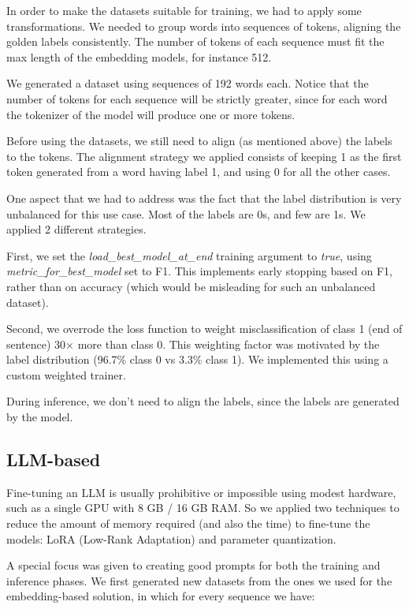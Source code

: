 \documentclass[11pt]{article}
\begin{document}
In order to make the datasets suitable for training, we had to apply some transformations. 
We needed to group words into sequences of tokens, aligning the golden labels consistently.
The number of tokens of each sequence must fit the max length of the embedding models,
for instance 512.

We generated a dataset using sequences of 192 words each. Notice that the number of tokens for each sequence will be strictly greater,
since for each word the tokenizer of the model will produce one or more tokens.

Before using the datasets, we still need to align (as mentioned above) the labels to the tokens.
The alignment strategy we applied consists of keeping 1 as the first token generated from a word
having label 1, and using 0 for all the other cases.

One aspect that we had to address was the fact that the label distribution is very unbalanced
for this use case. Most of the labels are 0s, and few are 1s. We applied 2 different strategies.

First, we set the \emph{load\_best\_model\_at\_end} training argument to \emph{true},
using \emph{metric\_for\_best\_model} set to F1. This implements early stopping based on F1,
rather than on accuracy (which would be misleading for such an unbalanced dataset).

Second, we overrode the loss function to weight misclassification of class 1 (end of sentence) 30× more than class 0. 
This weighting factor was motivated by the label distribution (96.7\% class 0 vs 3.3\% class 1). 
We implemented this using a custom weighted trainer. 

During inference, we don't need to align the labels, since the labels are generated by the model.

\subsection{LLM-based}

Fine-tuning an LLM is usually prohibitive or impossible using modest hardware, such as a single GPU with 8 GB / 16 GB RAM. So we applied two techniques to reduce the amount of memory required (and also the time) to fine-tune the models: LoRA (Low-Rank Adaptation) and parameter quantization.

A special focus was given to creating good prompts for both the training and inference phases.
We first generated new datasets from the ones we used for the embedding-based solution, in which 
for every sequence we have:
\end{document}
